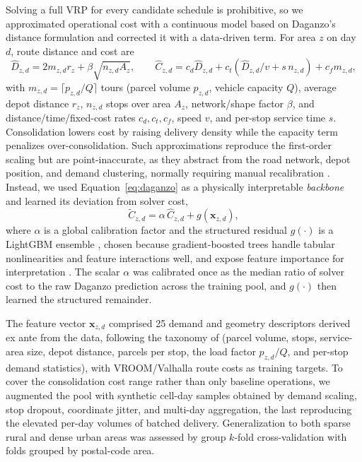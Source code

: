\documentclass[3p,times,procedia]{elsarticle}
\begin{document}
Solving a full VRP for every candidate schedule is prohibitive, so we approximated operational cost with a continuous model based on Daganzo's distance formulation \citep{Daganzo84} and corrected it with a data-driven term. For area $z$ on day $d$, route distance and cost are
\begin{equation}
\label{eq:daganzo}
\hat{D}_{z,d} = 2 m_{z,d} r_z + \beta\sqrt{n_{z,d} A_z}, \qquad
\hat{C}_{z,d} = c_d \hat{D}_{z,d} + c_t\!\left(\hat{D}_{z,d}/v + s\,n_{z,d}\right) + c_f m_{z,d},
\end{equation}
with $m_{z,d}=\lceil p_{z,d}/Q\rceil$ tours (parcel volume $p_{z,d}$, vehicle capacity $Q$), average depot distance $r_z$, $n_{z,d}$ stops over area $A_z$, network/shape factor $\beta$, and distance/time/fixed-cost rates $c_d, c_t, c_f$, speed $v$, and per-stop service time $s$. Consolidation lowers cost by raising delivery density while the capacity term penalizes over-consolidation. Such approximations reproduce the first-order scaling but are point-inaccurate, as they abstract from the road network, depot position, and demand clustering, normally requiring manual recalibration \citep{Figliozzi08}. Instead, we used Equation~\eqref{eq:daganzo} as a physically interpretable \emph{backbone} and learned its deviation from solver cost,
\begin{equation}
\label{eq:surrogate}
\tilde{C}_{z,d} = \alpha\,\hat{C}_{z,d} + g(\mathbf{x}_{z,d}),
\end{equation}
where $\alpha$ is a global calibration factor and the structured residual $g(\cdot)$ is a LightGBM ensemble \citep{NIPS20176449f44a}, chosen because gradient-boosted trees handle tabular nonlinearities and feature interactions well, and expose feature importance for interpretation \citep{10.5555/3600270.3600307}. The scalar $\alpha$ was calibrated once as the median ratio of solver cost to the raw Daganzo prediction across the training pool, and $g(\cdot)$ then learned the structured remainder.

The feature vector $\mathbf{x}_{z,d}$ comprised 25 demand and geometry descriptors derived ex ante from the data, following the taxonomy of \citet{Akkerman2025} (parcel volume, stops, service-area size, depot distance, parcels per stop, the load factor $p_{z,d}/Q$, and per-stop demand statistics), with VROOM/Valhalla route costs as training targets. To cover the consolidation cost range rather than only baseline operations, we augmented the pool with synthetic cell-day samples obtained by demand scaling, stop dropout, coordinate jitter, and multi-day aggregation, the last reproducing the elevated per-day volumes of batched delivery. Generalization to both sparse rural and dense urban areas was assessed by group $k$-fold cross-validation with folds grouped by postal-code area.
\end{document}
